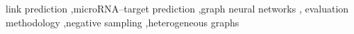 \documentclass[review]{elsarticle}
\begin{document}
\begin{frontmatter}

\begin{keyword}
link prediction \sep microRNA--target prediction \sep graph neural networks \sep
evaluation methodology \sep negative sampling \sep heterogeneous graphs
\end{keyword}

\end{frontmatter}
\end{document}
